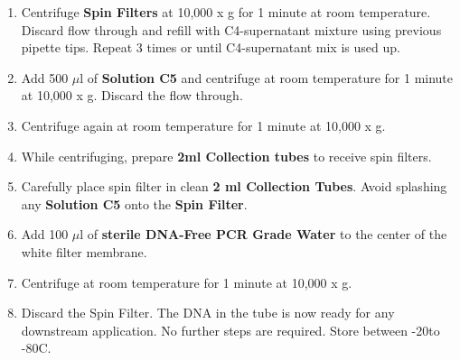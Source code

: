 \documentclass[11pt]{article}
\begin{document}
\begin{enumerate}
\item
Centrifuge \textbf{Spin Filters} at 10,000 x g for 1 minute at room temperature. Discard flow through and refill with C4-supernatant mixture using previous pipette tips. Repeat 3 times or until C4-supernatant mix is used up.

\item
Add 500 $\mu$l of \textbf{Solution C5} and centrifuge at room temperature for 1 minute at 10,000 x g. Discard the flow through.

\item
Centrifuge again at room temperature for 1 minute at 10,000 x g.

\item
While centrifuging, prepare \textbf{2ml Collection tubes} to receive spin filters.

\item
Carefully place spin filter in clean \textbf{2 ml Collection Tubes}. Avoid splashing any \textbf{Solution C5} onto the \textbf{Spin Filter}.

\item
Add 100 $\mu$l of \textbf{sterile DNA-Free PCR Grade Water} to the center of the white filter membrane.

\item
Centrifuge at room temperature for 1 minute at 10,000 x g.

\item
Discard the Spin Filter. The DNA in the tube is now ready for any downstream application. No further steps are required. Store between -20\degree to -80\degree C.

\end{enumerate}
\end{document}
